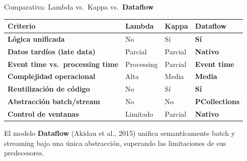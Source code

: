 \documentclass[aspectratio=169, 10pt]{beamer}
\begin{document}
\begin{frame}[shrink=5]{Comparativa: Lambda vs.\ Kappa vs.\ \textbf{Dataflow}}
  \vspace{-4pt}
  \begin{center}
  \renewcommand{\arraystretch}{1.35}
  \begin{tabular}{>{\bfseries\small}l
                  >{\centering\arraybackslash\small}p{2.5cm}
                  >{\centering\arraybackslash\small}p{2.5cm}
                  >{\centering\arraybackslash\small}p{2.8cm}}
    \toprule
    \textbf{Criterio}
      & \textbf{Lambda}
      & \textbf{Kappa}
      & \textbf{\textcolor{unirdarkblue}{Dataflow}} \\
    \midrule
    L\'ogica unificada
      & \textcolor{alertred}{No}
      & \textcolor{successgreen}{S\'i}
      & \textcolor{successgreen}{\textbf{S\'i}} \\
    Datos tard\'ios (late data)
      & \textcolor{warningorange}{Parcial}
      & \textcolor{warningorange}{Parcial}
      & \textcolor{successgreen}{\textbf{Nativo}} \\
    Event time vs.\ processing time
      & \textcolor{alertred}{Processing}
      & \textcolor{warningorange}{Parcial}
      & \textcolor{successgreen}{\textbf{Event time}} \\
    Complejidad operacional
      & \textcolor{alertred}{Alta}
      & \textcolor{warningorange}{Media}
      & \textcolor{warningorange}{\textbf{Media}} \\
    Reutilizaci\'on de c\'odigo
      & \textcolor{alertred}{No}
      & \textcolor{successgreen}{S\'i}
      & \textcolor{successgreen}{\textbf{S\'i}} \\
    Abstracci\'on batch/stream
      & \textcolor{alertred}{No}
      & \textcolor{alertred}{No}
      & \textcolor{successgreen}{\textbf{PCollections}} \\
    Control de ventanas
      & \textcolor{alertred}{Limitado}
      & \textcolor{warningorange}{Parcial}
      & \textcolor{successgreen}{\textbf{Nativo}} \\
    \bottomrule
  \end{tabular}
  \end{center}
  \vspace{4pt}
  \begin{exampleblock}{}
    \centering\small
    El modelo \textbf{Dataflow} (Akidau et al., 2015) unifica semant\'icamente
    batch y streaming bajo una \'unica abstracci\'on, superando las limitaciones
    de sus predecesores.
  \end{exampleblock}
\end{frame}
\end{document}
